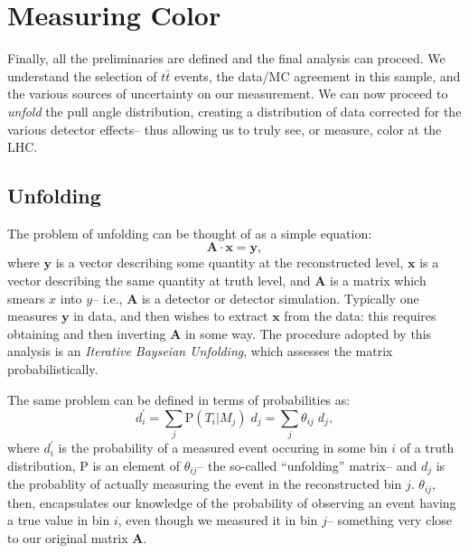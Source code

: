 \FloatBarrier

\section{Measuring Color}

Finally, all the preliminaries are defined and the final analysis can proceed. We understand the selection of $t\bar{t}$ events, the data/MC agreement in this sample, and the various sources of uncertainty on our measurement. We can now proceed to \textit{unfold} the pull angle distribution, creating a distribution of data corrected for the various detector effects-- thus allowing us to truly see, or measure, color at the LHC.

	\subsection{Unfolding}

	The problem of unfolding can be thought of as a simple equation:
	\begin{equation}
	\mathbf{A} \cdot \mathbf{x} = \mathbf{y},
	\end{equation}
	where $\mathbf{y}$ is a vector describing some quantity at the reconstructed level, $\mathbf{x}$ is a vector describing the same quantity at truth level, and $\mathbf{A}$ is a matrix which smears $x$ into $y$-- i.e., $\mathbf{A}$ is a detector or detector simulation. Typically one measures $\mathbf{y}$ in data, and then wishes to extract $\mathbf{x}$ from the data: this requires obtaining and then inverting $\mathbf{A}$ in some way. The procedure adopted by this analysis is an \textit{Iterative Bayseian Unfolding}, which assesses the matrix probabilistically. 

	The same problem can be defined in terms of probabilities as:
%
\begin{equation}
  d^\prime_i = \sum_j\mathrm{P}(T_i|M_j)\;d_j  = \sum_{j}\theta_{ij}\;d_j,
\end{equation}
%
	where $d^\prime_i$ is the probability of a measured event occuring in some bin $i$ of a truth distribution, $\mathrm{P}$ is an element of $\theta_{ij}$-- the so-called ``unfolding'' matrix-- and $d_j$ is the probablity of actually measuring the event in the reconstructed bin $j$. $\theta_{ij}$, then, encapsulates our knowledge of the probability of observing an event having a true value in bin $i$, even though we measured it in bin $j$-- something very close to our original matrix $\mathbf{A}$.

